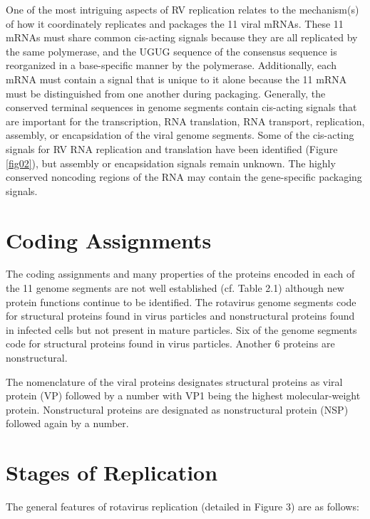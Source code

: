 \documentclass[11pt,final] {article}
\begin{document}
One of the most intriguing aspects of RV replication relates to the mechanism(s) of how it coordinately replicates and packages the 11 viral mRNAs. These 11 mRNAs must share common cis-acting signals because they are all replicated by the same polymerase, and the UGUG sequence of the consensus sequence is reorganized in a base-specific manner by the polymerase. Additionally, each mRNA must contain a signal that is unique to it alone because the 11 mRNA must be distinguished from one another during packaging. Generally, the conserved terminal sequences in genome segments contain cis-acting signals that are important for the transcription, RNA translation, RNA transport, replication, assembly, or encapsidation of the viral genome segments. Some of the cis-acting signals for RV RNA replication and translation have been identified (Figure \ref{fig02}), but assembly or encapsidation signals remain unknown. The highly conserved noncoding regions of the RNA may contain the gene-specific packaging signals.

\section{Coding Assignments}

The coding assignments and many properties of the proteins encoded in each of the 11 genome segments are not well established (cf. Table 2.1) although new protein functions continue to be identified. The rotavirus genome segments code for structural proteins found in virus particles and nonstructural proteins found in infected cells but not present in mature particles. Six of the genome segments code for structural proteins found in virus particles. Another 6 proteins are nonstructural.

The nomenclature of the viral proteins designates structural proteins as viral protein (VP) followed by a number with VP1 being the highest molecular-weight protein. Nonstructural proteins are designated as nonstructural protein (NSP) followed again by a number.

\section{Stages of Replication}

The general features of rotavirus replication (detailed in Figure 3) are as follows:
\end{document}
